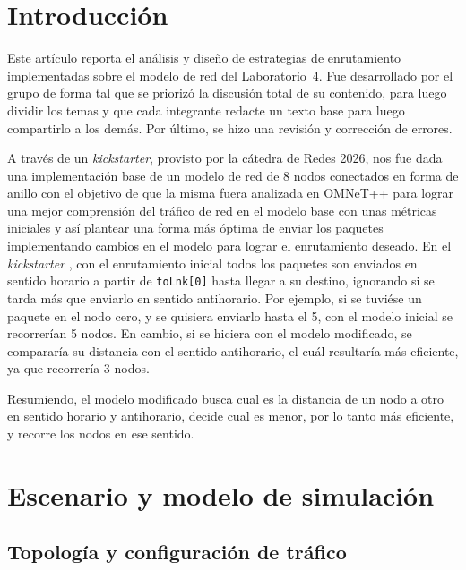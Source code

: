 \documentclass[10pt,letterpaper,twocolumn]{article}
\begin{document}

\section{Introducción}
\label{sec:intro}

Este artículo reporta el análisis y diseño de estrategias de enrutamiento
implementadas sobre el modelo de red del Laboratorio~4. Fue desarrollado por el grupo de forma tal que se priorizó la discusión total
de su contenido, para luego dividir los temas y que cada integrante redacte un texto base para luego
compartirlo a los demás. Por último, se hizo una revisión y corrección de errores.

A través de un \textit{kickstarter}, provisto por la cátedra de Redes 2026, nos fue dada una implementación base
de un modelo de red de 8 nodos conectados en forma de anillo 
con el objetivo de que la misma fuera analizada en OMNeT++ para lograr 
una mejor comprensión del tráfico de red en el modelo base con unas métricas iniciales
y así plantear una forma más óptima de enviar los paquetes
implementando cambios en el modelo para lograr el enrutamiento deseado. 
En el \textit{kickstarter} , con el enrutamiento inicial todos los paquetes son enviados en 
sentido horario a partir de \texttt{toLnk[0]} hasta llegar a su destino, 
ignorando si se tarda más que enviarlo en sentido antihorario. 
Por ejemplo, si se tuviése un paquete en el nodo cero, y se quisiera enviarlo hasta el 5, con el modelo inicial
se recorrerían 5 nodos. En cambio, si se hiciera con el modelo modificado, se compararía su distancia con el sentido antihorario, 
el cuál resultaría más eficiente, ya que recorrería 3 nodos.


Resumiendo, el modelo modificado busca cual es la distancia de un nodo a otro en sentido horario y antihorario,
decide cual es menor, por lo tanto más eficiente, y recorre los nodos en ese sentido.

\section{Escenario y modelo de simulación}
\label{sec:modelo}

\subsection{Topología y configuración de tráfico}
\end{document}

